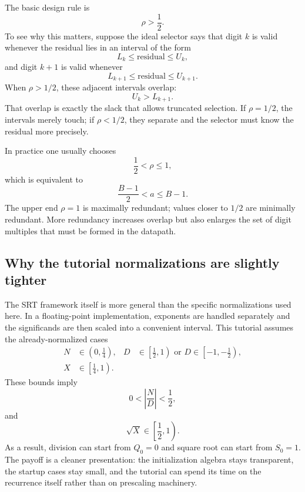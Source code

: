 \documentclass[11pt]{article}
\numberwithin{equation}{section}
\begin{document}
The basic design rule is
\begin{equation}
  \label{eq:preliminaries:rho_gt_half}
  \rho > \frac{1}{2}.
\end{equation}
To see why this matters, suppose the ideal selector says that digit $k$ is valid whenever the
residual lies in an interval of the form
\[
  L_k \le \text{residual} \le U_k,
\]
and digit $k+1$ is valid whenever
\[
  L_{k+1} \le \text{residual} \le U_{k+1}.
\]
When $\rho > 1/2$, these adjacent intervals overlap:
\[
  U_k > L_{k+1}.
\]
That overlap is exactly the slack that allows truncated selection.
If $\rho = 1/2$, the intervals merely touch; if $\rho < 1/2$, they separate and the selector must
know the residual more precisely.

In practice one usually chooses
\begin{equation}
  \label{eq:preliminaries:rho_range}
  \frac{1}{2} < \rho \le 1,
\end{equation}
which is equivalent to
\begin{equation}
  \label{eq:preliminaries:a_range}
  \frac{B-1}{2} < a \le B-1.
\end{equation}
The upper end $\rho = 1$ is maximally redundant; values closer to $1/2$ are minimally redundant.
More redundancy increases overlap but also enlarges the set of digit multiples that must be formed
in the datapath.

\subsection{Why the tutorial normalizations are slightly tighter}
\label{ssec:preliminaries:normalization}

The SRT framework itself is more general than the specific normalizations used here.
In a floating-point implementation, exponents are handled separately and the significands are then
scaled into a convenient interval.
This tutorial assumes the already-normalized cases
\begin{align}
  \label{eq:preliminaries:division_norm}
  N &\in \left(0,\frac{1}{4}\right),
  &
  D &\in \left[\frac{1}{2},1\right)
  \text{ or }
  D \in \left[-1,-\frac{1}{2}\right), \\
  \label{eq:preliminaries:sqrt_norm}
  X &\in \left[\frac{1}{4},1\right).
\end{align}
These bounds imply
\[
  0 < \left|\frac{N}{D}\right| < \frac{1}{2},
\]
and
\[
  \sqrt{X} \in \left[\frac{1}{2},1\right).
\]
As a result, division can start from $Q_0 = 0$ and square root can start from $S_0 = 1$.
The payoff is a cleaner presentation: the initialization algebra stays transparent, the startup
cases stay small, and the tutorial can spend its time on the recurrence itself rather than on
prescaling machinery.
\end{document}
